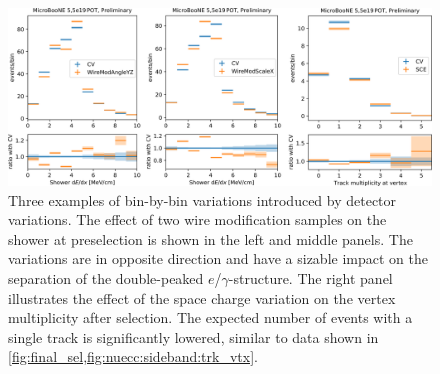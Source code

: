 \begin{figure}
    \centering
    \includegraphics[width=\textwidth]{NueCCsel/Images/syst/syst_variations.png}
    \caption{Three examples of bin-by-bin variations introduced by detector variations. The effect of two wire modification samples on the shower \dedx at preselection is shown in the left and middle panels. The variations are in opposite direction and have a sizable impact on the separation of the double-peaked $e$/$\gamma$-structure. The right panel illustrates the effect of the space charge variation on the vertex multiplicity after selection. The expected number of events with a single track is significantly lowered, similar to data shown in \cref{fig:final_sel,fig:nuecc:sideband:trk_vtx}. }
    \label{fig:nuecc:detvar_ex}
\end{figure}


